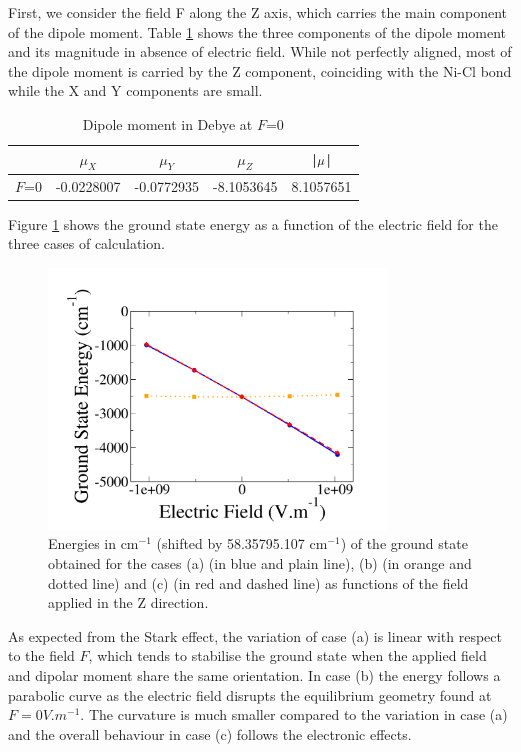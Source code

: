 \documentclass[12pt]{report}
\numberwithin{equation}{section}
\begin{document}
First, we consider the field F along the Z axis, which carries the main component of the dipole moment.
Table \ref{tab:DipF0Z} shows the three components of the dipole moment and its magnitude in absence of electric field.
While not perfectly aligned, most of the dipole moment is carried by the Z component, coinciding with the Ni-Cl bond while the X and Y components are small.

\begin{table}[h]
    \centering
    \begin{tabular}{|c | c c c | c|}
        \hline
        & $\mu_X$ & $\mu_Y$ & $\mu_Z$ & |$\vb \mu$|\\
        \hline
        $F$=0 & -0.0228007 & -0.0772935 & -8.1053645 & 8.1057651   \\
        \hline
    \end{tabular}
    \caption{Dipole moment in Debye at $F$=0}
    \label{tab:DipF0Z}
\end{table}

Figure \ref{GSE_Z} shows the ground state energy as a function of the electric field for the three cases of calculation.

\begin{figure}[!ht]
    \centering
    \includegraphics[width=0.8\textwidth]{Images/E_Z_grand.png}
    \caption{Energies in cm$^{-1}$ (shifted by 58.35795.107 cm$^{-1}$) of the ground state obtained for the cases (a) (in blue and plain line), (b)
    (in orange and dotted line) and (c) (in red and dashed line) as functions of the field applied in the Z direction.}
    \label{GSE_Z}
\end{figure}
As expected from the Stark effect, the variation of case (a) is linear with respect to the field $F$, which tends to stabilise the ground state when the applied field and dipolar moment share the same orientation.
In case (b) the energy follows a parabolic curve as the electric field disrupts the equilibrium geometry found at $F=0V.m^{-1}$. 
The curvature is much smaller compared to the variation in case (a) and the overall behaviour in case (c) follows the electronic effects.
\end{document}

